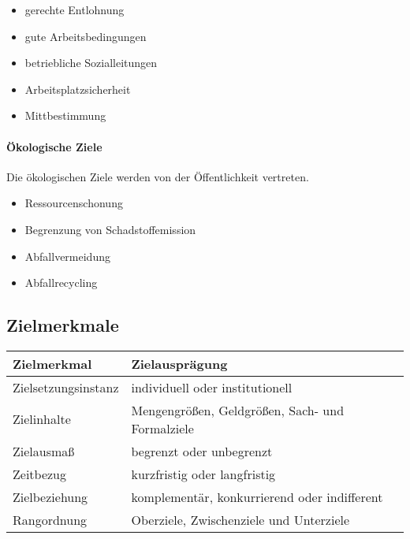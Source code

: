 \documentclass[../main.tex]{subfiles}
\begin{document}
                \begin{itemize}
                    \item gerechte Entlohnung
                    \item gute Arbeitsbedingungen
                    \item betriebliche Sozialleitungen
                    \item Arbeitsplatzsicherheit
                    \item Mittbestimmung
                \end{itemize}
                
            \paragraph{Ökologische Ziele}
                Die ökologischen Ziele werden von der Öffentlichkeit vertreten.
            
                \begin{itemize}
                    \item Ressourcenschonung
                    \item Begrenzung von Schadstoffemission
                    \item Abfallvermeidung
                    \item Abfallrecycling
                \end{itemize}
            

        \subsection{Zielmerkmale}        
            \begin{tabular}{l l}
                \textbf{Zielmerkmal} & \textbf{Zielausprägung} \\
                \hline
                Zielsetzungsinstanz & individuell oder institutionell \\
                Zielinhalte & Mengengrößen, Geldgrößen, Sach- und Formalziele \\
                Zielausmaß & begrenzt oder unbegrenzt \\
                Zeitbezug & kurzfristig oder langfristig \\
                Zielbeziehung & komplementär, konkurrierend oder indifferent \\
                Rangordnung & Oberziele, Zwischenziele und Unterziele
            \end{tabular}
            
\end{document}
